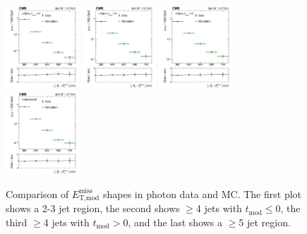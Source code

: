 \begin{figure}[htb]
\centering
\includegraphics[width=0.245\textwidth]{figures/metres_DataVsSim_AB.pdf}
\includegraphics[width=0.245\textwidth]{figures/metres_DataVsSim_CD.pdf}
\includegraphics[width=0.245\textwidth]{figures/metres_DataVsSim_EFGH.pdf}
\includegraphics[width=0.245\textwidth]{figures/metres_DataVsSim_I.pdf}
\caption{Comparison of $E_\text{T,mod}^\text{miss}$ shapes in photon
  data and MC. The first plot shows a 2-3 jet region, the second shows
  $\geq$4 jets with $t_\text{mod}\leq$0, the third $\geq$4 jets with
  $t_\text{mod}>$0, and the last shows a $\geq$5 jet region.}
\label{fig:metres:datamcratio}
\end{figure}

